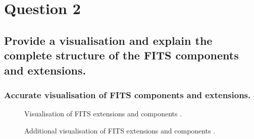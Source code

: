 \documentclass[a4paper,oneside,11pt]{book}
\begin{document}
\chapter{Question 2}
\section{Provide a visualisation and explain the complete structure of the FITS components and extensions.}
\subsection{Accurate visualisation of FITS components and extensions.}
\begin{figure}[h]
    \centering
    \caption{Visualisation of FITS extensions and components \citep{fits_3}.}
\end{figure}
\begin{figure}[h]
    \centering
    \caption{Additional visualisation of FITS extensions and components \citep{fits_3}.}
\end{figure}
\end{document}

